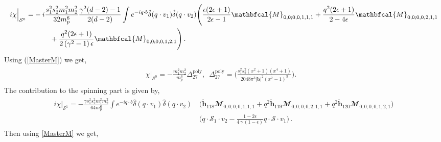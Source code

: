  \begin{align}
     \begin{split}
         i\chi\Big|_{\mathcal{S}^{0}}=& -i\frac{s_1^2 s_2^2 m_1^2 m_2^2}{32 m_p^6} \frac{\gamma^2(d-2)-1}{2(d-2)}\int e^{-iq\cdot b}\hat\delta(q\cdot v_1)\hat\delta(q\cdot v_2)\Bigg(\frac{\epsilon  (2 \epsilon +1)}{2 \epsilon -1}\mathbfcal{M}_{0,0;0,0,1,1,1}+\frac{q^2 (2 \epsilon +1)}{2-4 \epsilon }\mathbfcal{M}_{0,0;0,0,2,1,1}\\ &\hspace{0.8cm}+\frac{q^2 (2 \epsilon +1)}{2 \left(\gamma ^2-1\right) \epsilon }\mathbfcal{M}_{0,0;0,0,1,2,1}\Bigg)\,.
     \end{split}
 \end{align}
 Using (\ref{MasterM}) we get, 
 \begin{align}
     \begin{split}  \label{eqt20} 
     \chi\Big|_{\mathcal{S}^{0}}=-\frac{m_1^2m_2^2}{m_p^6}\Delta_{\mathfrak{27}}^{\textrm{poly}},\,\,\,\Delta_{\mathfrak{27}}^{\textrm{poly}}=\Bigg(\frac{s_{1}^2 s_{2}^2 \left(x^2+1\right) \left(x^4+1\right)}{2048 \pi ^3 |\boldsymbol{b}|^2 \left(x^2-1\right)^3}\Bigg).&
      \end{split}
 \end{align}
The contribution to the spinning part is given by,
 \begin{align}
     \begin{split}
         i\chi\Big|_{\mathcal{S}^{1}}= -\frac{\gamma s_1^2 s_2^2 m_1^2 m_2^2}{64 m_p^6}\int e^{-i q\cdot b}\hat\delta(q\cdot v_1)\hat\delta(q\cdot v_2)\,&\Bigg(\boldsymbol{\tilde h}_{118}\mathbfcal{M}_{0,0;0,0,1,1,1}+q^2 \boldsymbol{\tilde h}_{119}\mathbfcal{M}_{0,0;0,0,2,1,1} +q^2 \boldsymbol{\tilde h}_{120}\mathbfcal{M}_{0,0;0,0,1,2,1}\Bigg)\\&\Bigg(q\cdot\mathcal{S}_1\cdot v_2- \frac{1-2\epsilon}{4\,\gamma\,(1-\epsilon)}q\cdot\mathcal{S}\cdot v_1\Bigg)\,.
     \end{split}
 \end{align}
 Then using \eqref{MasterM} we get,

